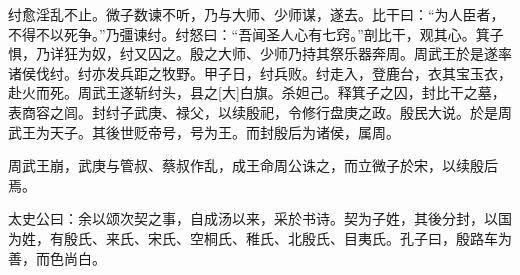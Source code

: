\documentclass[UTF8,12pt,AutoFakeBold]{ctexart}
\begin{document}
	纣愈淫乱不止。微子数谏不听，乃与大师、少师谋，遂去。比干曰：“为人臣者，不得不以死争。”乃彊谏纣。纣怒曰：“吾闻圣人心有七窍。”剖比干，观其心。箕子惧，乃详狂为奴，纣又囚之。殷之大师、少师乃持其祭乐器奔周。周武王於是遂率诸侯伐纣。纣亦发兵距之牧野。甲子日，纣兵败。纣走入，登鹿台，衣其宝玉衣，赴火而死。周武王遂斩纣头，县之[大]白旗。杀妲己。释箕子之囚，封比干之墓，表商容之闾。封纣子武庚、禄父，以续殷祀，令修行盘庚之政。殷民大说。於是周武王为天子。其後世贬帝号，号为王。而封殷后为诸侯，属周。
	
	周武王崩，武庚与管叔、蔡叔作乱，成王命周公诛之，而立微子於宋，以续殷后焉。
	
	太史公曰：余以颂次契之事，自成汤以来，采於书诗。契为子姓，其後分封，以国为姓，有殷氏、来氏、宋氏、空桐氏、稚氏、北殷氏、目夷氏。孔子曰，殷路车为善，而色尚白。
	
	
	\pagebreak
	{}%
	\pagebreak
	
\end{document}
